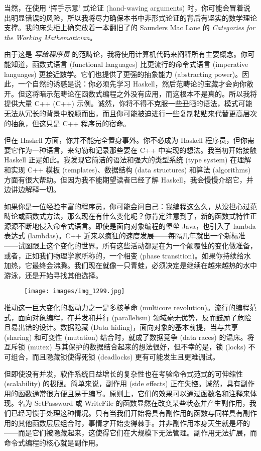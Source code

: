 当然，在使用 ‘挥手示意’ 式论证 (hand-waving arguments) 时，你可能会冒着说出明显错误的风险，所以我将尽力确保本书中非形式论证的背后有坚实的数学理论支撑。我的床头柜上确实放着一本翻旧了的 Saunders Mac Lane 的 \emph{Categories for the Working Mathematician}。

由于这是 \emph{写给程序员} 的范畴论，我将使用计算机代码来阐释所有主要概念。你可能知道，函数式语言 (functional languages) 比更流行的命令式语言 (imperative languages) 更接近数学。它们也提供了更强的抽象能力 (abstracting power)。因此，一个自然的诱惑是说：你必须先学习 Haskell，然后范畴论的宝藏才会向你敞开。但这将暗示范畴论在函数式编程之外没有应用，而这根本不是真的。所以我将提供大量 C++ (C++) 示例。诚然，你将不得不克服一些丑陋的语法，模式可能无法从冗长的背景中脱颖而出，而且你可能被迫进行一些复制粘贴来代替更高层次的抽象，但这只是 C++ 程序员的宿命。

但在 Haskell 方面，你并不能完全置身事外。你不必成为 Haskell 程序员，但你需要它作为一种语言，来勾勒和记录那些要在 C++ 中实现的想法。我当初开始接触 Haskell 正是如此。我发现它简洁的语法和强大的类型系统 (type system) 在理解和实现 C++ 模板 (templates)、数据结构 (data structures) 和算法 (algorithms) 方面有很大帮助。但因为我不能期望读者已经了解 Haskell，我会慢慢介绍它，并边讲边解释一切。

如果你是一位经验丰富的程序员，你可能会问自己：我编程这么久，从没担心过范畴论或函数式方法，那么现在有什么变化呢？你肯定注意到了，新的函数式特性正源源不断地侵入命令式语言。即使是面向对象编程的堡垒 Java，也引入了 lambda 表达式 (lambdas)。C++ 近来以疯狂的速度发展——每隔几年就出一个新标准——试图跟上这个变化的世界。所有这些活动都是在为一个颠覆性的变化做准备，或者，正如我们物理学家所称的，一个相变 (phase transition)。如果你持续给水加热，它最终会沸腾。我们现在就像一只青蛙，必须决定是继续在越来越热的水中游泳，还是开始寻找其他选择。

\begin{figure}[H]
  \centering
  \texttt{[image: images/img\_1299.jpg]}
\end{figure}

\noindent
推动这一巨大变化的驱动力之一是多核革命 (multicore revolution)。流行的编程范式，面向对象编程，在并发和并行 (parallelism) 领域毫无优势，反而鼓励了危险且易出错的设计。数据隐藏 (Data hiding)，面向对象的基本前提，当与共享 (sharing) 和可变性 (mutation) 结合时，就成了数据竞争 (data races) 的温床。将互斥锁 (mutex) 与其保护的数据结合起来的想法很好，但不幸的是，锁 (locks) 不可组合，而且隐藏锁使得死锁 (deadlocks) 更有可能发生且更难调试。

但即使没有并发，软件系统日益增长的复杂性也在考验命令式范式的可伸缩性 (scalability) 的极限。简单来说，副作用 (side effects) 正在失控。诚然，具有副作用的函数通常很方便且易于编写。原则上，它们的效果可以通过函数名和注释来体现。名为 SetPassword 或 WriteFile 的函数显然在改变某些状态并产生副作用，我们已经习惯于处理这种情况。只有当我们开始将具有副作用的函数与同样具有副作用的其他函数层层组合时，事情才开始变得棘手。并非副作用本身天生就是坏的——而是它们被隐藏起来，这使得它们在大规模下无法管理。副作用无法扩展，而命令式编程的核心就是副作用。

